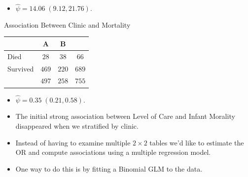 \documentclass[oneside]{book}\usepackage[]{graphicx}\usepackage[svgnames]{xcolor}
\newcommand{\OR}{\text{OR}}%
\begin{document}
\begin{itemize}
      \item $ \hat{\psi}=14.06\;(9.12,21.76) $.
\end{itemize}
\begin{Example}{Association Between Clinic and Mortality}
      \begin{center}
            \begin{NiceTabular}{l|cc|c}
                  & A                            & B &                                         \\
                  \midrule
                  Died & $ 28 $                            & $ 38 $                 & $ 66 $         \\
                  Survived   & $ 469 $                            & $ 220 $                 & $ 689 $         \\
                  \midrule
                  & $ 497 $                    & $ 258 $ & $ 755 $
            \end{NiceTabular}
      \end{center}
\end{Example}
\begin{itemize}
      \item $ \hat{\psi}=0.35\;(0.21,0.58) $.
\end{itemize}
\begin{itemize}
      \item The initial strong association between Level of Care and Infant Morality
            disappeared when we stratified by clinic.
            \begin{figure}[!htbp]
                  \centering
            \end{figure}
      \item Instead of having to examine multiple $ 2\times 2 $ tables we'd like to estimate the $ \OR $
            and compute associations using a multiple regression model.
      \item One way to do this is by fitting a Binomial GLM to the data.
\end{itemize}
\end{document}
